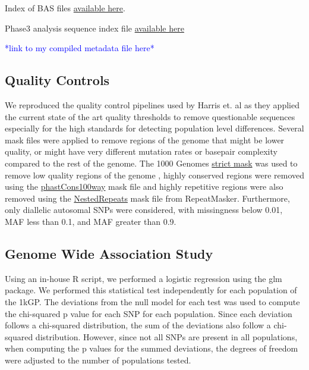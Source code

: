 \documentclass[9pt,lineno]{elife}
\newcommand{\todo}[1]{\textcolor{blue}{*#1*}}
\begin{document}
Index of BAS files \href{http://ftp.1000genomes.ebi.ac.uk/vol1/ftp/data_collections/1000_genomes_project/1000genomes.low_coverage.GRCh38DH.alignment.index}{available here}.

Phase3 analysis sequence index file  \href{http://ftp.1000genomes.ebi.ac.uk/vol1/ftp/phase3/20130502.phase3.analysis.sequence.index}{available here} 

\todo{link to my compiled metadata file here}

\subsection{Quality Controls}
We reproduced the quality control pipelines used by Harris et. al as they applied the current state of the art quality thresholds to remove questionable sequences especially for the high standards for detecting population level differences. 
Several mask files were applied to remove regions of the genome that might be lower quality, or might have very different mutation rates or basepair complexity compared to the rest of the genome. 
The  1000 Genomes \href{http://ftp.1000genomes.ebi.ac.uk/vol1/ftp/release/20130502/supporting/accessible_genome_masks/20141020.strict_mask.whole_genome.bed}{strict mask} was used to remove low quality regions of the genome , highly conserved regions were removed using the \href{http://hgdownload.cse.ucsc.edu/goldenPath/hg19/database/phastConsElements100way.txt.gz}{phastCons100way} mask file and highly repetitive regions were also removed using the \href{http://hgdownload.cse.ucsc.edu/goldenpath/hg19/database/nestedRepeats.txt.gz}{NestedRepeats} mask file from RepeatMasker. 
Furthermore, only diallelic autosomal SNPs were considered, with missingness below 0.01, MAF less than 0.1, and MAF greater than 0.9.

\subsection{Genome Wide Association Study}
Using an in-house R script, we performed a logistic regression using the glm package. \cite{[R and GLM]} We performed this statistical test independently for each population of the 1kGP. The deviations from the null model for each test was used to compute the chi-squared p value for each SNP for each population. Since each deviation follows a chi-squared distribution, the sum of the deviations also follow a chi-squared distribution. However, since not all SNPs are present in all populations, when computing the p values for the summed deviations, the degrees of freedom were adjusted to the number of populations tested. 
\end{document}
